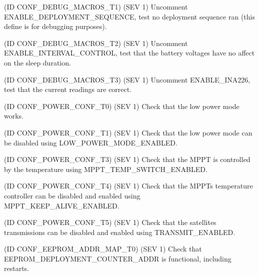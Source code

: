 \begin{DoxyRefList}
(ID C\+O\+N\+F\+\_\+\+D\+E\+B\+U\+G\+\_\+\+M\+A\+C\+R\+O\+S\+\_\+\+T1) (S\+EV 1) Uncomment E\+N\+A\+B\+L\+E\+\_\+\+D\+E\+P\+L\+O\+Y\+M\+E\+N\+T\+\_\+\+S\+E\+Q\+U\+E\+N\+CE, test no deployment sequence ran (this define is for debugging purposes). 

(ID C\+O\+N\+F\+\_\+\+D\+E\+B\+U\+G\+\_\+\+M\+A\+C\+R\+O\+S\+\_\+\+T2) (S\+EV 1) Uncomment E\+N\+A\+B\+L\+E\+\_\+\+I\+N\+T\+E\+R\+V\+A\+L\+\_\+\+C\+O\+N\+T\+R\+OL, test that the battery voltages have no affect on the sleep duration. 

(ID C\+O\+N\+F\+\_\+\+D\+E\+B\+U\+G\+\_\+\+M\+A\+C\+R\+O\+S\+\_\+\+T3) (S\+EV 1) Uncomment E\+N\+A\+B\+L\+E\+\_\+\+I\+N\+A226, test that the current readings are correct. 
\item[\label{test__test000018}%
\Hypertarget{test__test000018}%
Module \hyperlink{group__defines__default__power__configuration}{defines\+\_\+default\+\_\+power\+\_\+configuration} ](ID C\+O\+N\+F\+\_\+\+P\+O\+W\+E\+R\+\_\+\+C\+O\+N\+F\+\_\+\+T0) (S\+EV 1) Check that the low power mode works. 

(ID C\+O\+N\+F\+\_\+\+P\+O\+W\+E\+R\+\_\+\+C\+O\+N\+F\+\_\+\+T1) (S\+EV 1) Check that the low power mode can be disabled using L\+O\+W\+\_\+\+P\+O\+W\+E\+R\+\_\+\+M\+O\+D\+E\+\_\+\+E\+N\+A\+B\+L\+ED. 

(ID C\+O\+N\+F\+\_\+\+P\+O\+W\+E\+R\+\_\+\+C\+O\+N\+F\+\_\+\+T3) (S\+EV 1) Check that the M\+P\+PT is controlled by the temperature using M\+P\+P\+T\+\_\+\+T\+E\+M\+P\+\_\+\+S\+W\+I\+T\+C\+H\+\_\+\+E\+N\+A\+B\+L\+ED. 

(ID C\+O\+N\+F\+\_\+\+P\+O\+W\+E\+R\+\_\+\+C\+O\+N\+F\+\_\+\+T4) (S\+EV 1) Check that the M\+P\+PT\textquotesingle{}s temperature controller can be disabled and enabled using M\+P\+P\+T\+\_\+\+K\+E\+E\+P\+\_\+\+A\+L\+I\+V\+E\+\_\+\+E\+N\+A\+B\+L\+ED. 

(ID C\+O\+N\+F\+\_\+\+P\+O\+W\+E\+R\+\_\+\+C\+O\+N\+F\+\_\+\+T5) (S\+EV 1) Check that the satellite\textquotesingle{}s transmissions can be disabled and enabled using T\+R\+A\+N\+S\+M\+I\+T\+\_\+\+E\+N\+A\+B\+L\+ED. 
\item[\label{test__test000020}%
\Hypertarget{test__test000020}%
Module \hyperlink{group__defines__eeprom__address__map}{defines\+\_\+eeprom\+\_\+address\+\_\+map} ](ID C\+O\+N\+F\+\_\+\+E\+E\+P\+R\+O\+M\+\_\+\+A\+D\+D\+R\+\_\+\+M\+A\+P\+\_\+\+T0) (S\+EV 1) Check that E\+E\+P\+R\+O\+M\+\_\+\+D\+E\+P\+L\+O\+Y\+M\+E\+N\+T\+\_\+\+C\+O\+U\+N\+T\+E\+R\+\_\+\+A\+D\+DR is functional, including restarts. 


\end{DoxyRefList}
